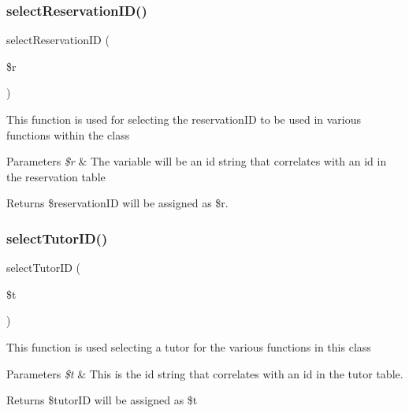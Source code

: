 \subsubsection{\texorpdfstring{selectReservationID()}{selectReservationID()}}
{\footnotesize\ttfamily select\+Reservation\+ID (\begin{DoxyParamCaption}\item[{}]{\$r }\end{DoxyParamCaption})}

This function is used for selecting the reservation\+ID to be used in various functions within the class 
\begin{DoxyParams}{Parameters}
{\em \$r} & The variable will be an id string that correlates with an id in the reservation table \\
\hline
\end{DoxyParams}
\begin{DoxyReturn}{Returns}
\$reservation\+ID will be assigned as \$r. 
\end{DoxyReturn}
\mbox{\label{_tutor___selection_8class_8php_abd658239b3f73bb1c30c51b4f4c4f2a2}} 
\subsubsection{\texorpdfstring{selectTutorID()}{selectTutorID()}}
{\footnotesize\ttfamily select\+Tutor\+ID (\begin{DoxyParamCaption}\item[{}]{\$t }\end{DoxyParamCaption})}

This function is used selecting a tutor for the various functions in this class 
\begin{DoxyParams}{Parameters}
{\em \$t} & This is the id string that correlates with an id in the tutor table. \\
\hline
\end{DoxyParams}
\begin{DoxyReturn}{Returns}
\$tutor\+ID will be assigned as \$t 
\end{DoxyReturn}
\mbox{\label{_tutor___selection_8class_8php_abe3cd5bb61d47a195d45d6f2dd6477c6}} 
